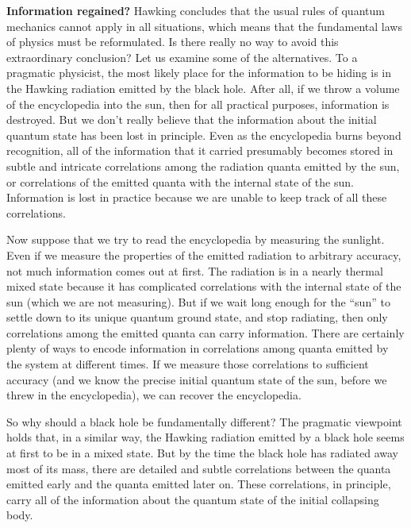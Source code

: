 \bigskip
{\bf Information regained?}
Hawking concludes that the usual rules of quantum mechanics cannot apply in all
situations, which means that the fundamental laws of physics must be
reformulated.  Is there really no way to avoid this extraordinary conclusion?
Let us examine some of the alternatives.\lref{}\lref{}
\bigskip
{}
To a pragmatic physicist, the most likely place for the information to be
hiding is in the Hawking radiation emitted by the black hole.  After all, if we
throw a volume of the encyclopedia into the sun, then for all practical
purposes,
information is destroyed.  But we don't really believe that the information
about the initial quantum state has been lost in principle.  Even as the
encyclopedia burns beyond recognition, all of the information that it carried
presumably becomes stored in subtle and intricate correlations among the
radiation quanta emitted by the sun, or correlations of the emitted quanta with
the internal state of the sun.  Information is lost in practice because we are
unable to keep track of all these correlations.

Now suppose that we try to read the encyclopedia by measuring the sunlight.
Even if we measure the properties of the emitted radiation to arbitrary
accuracy, not much information comes out at first.  The radiation is in a
nearly thermal mixed state because it has complicated correlations with the
internal state of the sun (which we are not measuring).
But if we wait long enough for the ``sun'' to settle down to its unique quantum
ground state, and stop radiating, then only correlations among the emitted
quanta can carry information.  There are certainly plenty of ways to encode
information in correlations among quanta emitted by the system at different
times.  If we measure those correlations to sufficient accuracy (and we know
the precise initial quantum state of the sun, before we threw in the
encyclopedia), we can recover
the encyclopedia.

So why should a black hole be fundamentally different?  The pragmatic viewpoint
holds that, in a similar way, the Hawking
radiation emitted by a black hole seems at first to be in a mixed state\page.
But
by the time the black hole has radiated away most of its mass, there are
detailed and subtle correlations between the quanta emitted early and the
quanta emitted later on.  These correlations, in principle, carry all of the
information about the quantum state of the initial collapsing body.

